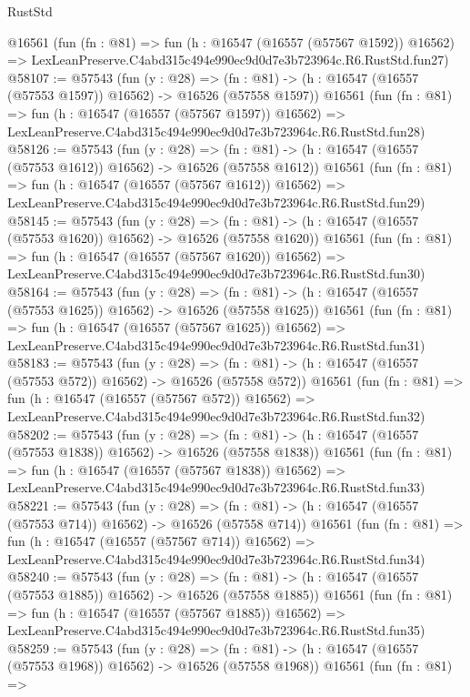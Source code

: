 \begin{lexlean}{RustStd}
\begin{coremodule}
    @16561
    (fun (fn : @81) =>
    fun (h : @16547 (@16557 (@57567 @1592)) @16562) =>
    LexLeanPreserve.C4abd315c494e990ec9d0d7e3b723964c.R6.RustStd.fun27)
@58107 := @57543
    (fun (y : @28) =>
    (fn : @81) -> (h : @16547 (@16557 (@57553 @1597)) @16562) -> @16526 (@57558 @1597))
    @16561
    (fun (fn : @81) =>
    fun (h : @16547 (@16557 (@57567 @1597)) @16562) =>
    LexLeanPreserve.C4abd315c494e990ec9d0d7e3b723964c.R6.RustStd.fun28)
@58126 := @57543
    (fun (y : @28) =>
    (fn : @81) -> (h : @16547 (@16557 (@57553 @1612)) @16562) -> @16526 (@57558 @1612))
    @16561
    (fun (fn : @81) =>
    fun (h : @16547 (@16557 (@57567 @1612)) @16562) =>
    LexLeanPreserve.C4abd315c494e990ec9d0d7e3b723964c.R6.RustStd.fun29)
@58145 := @57543
    (fun (y : @28) =>
    (fn : @81) -> (h : @16547 (@16557 (@57553 @1620)) @16562) -> @16526 (@57558 @1620))
    @16561
    (fun (fn : @81) =>
    fun (h : @16547 (@16557 (@57567 @1620)) @16562) =>
    LexLeanPreserve.C4abd315c494e990ec9d0d7e3b723964c.R6.RustStd.fun30)
@58164 := @57543
    (fun (y : @28) =>
    (fn : @81) -> (h : @16547 (@16557 (@57553 @1625)) @16562) -> @16526 (@57558 @1625))
    @16561
    (fun (fn : @81) =>
    fun (h : @16547 (@16557 (@57567 @1625)) @16562) =>
    LexLeanPreserve.C4abd315c494e990ec9d0d7e3b723964c.R6.RustStd.fun31)
@58183 := @57543
    (fun (y : @28) =>
    (fn : @81) -> (h : @16547 (@16557 (@57553 @572)) @16562) -> @16526 (@57558 @572))
    @16561
    (fun (fn : @81) =>
    fun (h : @16547 (@16557 (@57567 @572)) @16562) =>
    LexLeanPreserve.C4abd315c494e990ec9d0d7e3b723964c.R6.RustStd.fun32)
@58202 := @57543
    (fun (y : @28) =>
    (fn : @81) -> (h : @16547 (@16557 (@57553 @1838)) @16562) -> @16526 (@57558 @1838))
    @16561
    (fun (fn : @81) =>
    fun (h : @16547 (@16557 (@57567 @1838)) @16562) =>
    LexLeanPreserve.C4abd315c494e990ec9d0d7e3b723964c.R6.RustStd.fun33)
@58221 := @57543
    (fun (y : @28) =>
    (fn : @81) -> (h : @16547 (@16557 (@57553 @714)) @16562) -> @16526 (@57558 @714))
    @16561
    (fun (fn : @81) =>
    fun (h : @16547 (@16557 (@57567 @714)) @16562) =>
    LexLeanPreserve.C4abd315c494e990ec9d0d7e3b723964c.R6.RustStd.fun34)
@58240 := @57543
    (fun (y : @28) =>
    (fn : @81) -> (h : @16547 (@16557 (@57553 @1885)) @16562) -> @16526 (@57558 @1885))
    @16561
    (fun (fn : @81) =>
    fun (h : @16547 (@16557 (@57567 @1885)) @16562) =>
    LexLeanPreserve.C4abd315c494e990ec9d0d7e3b723964c.R6.RustStd.fun35)
@58259 := @57543
    (fun (y : @28) =>
    (fn : @81) -> (h : @16547 (@16557 (@57553 @1968)) @16562) -> @16526 (@57558 @1968))
    @16561
    (fun (fn : @81) =>

\end{coremodule}
\end{lexlean}
